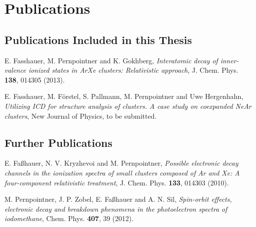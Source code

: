 \chapter*{Publications}

\section*{Publications Included in this Thesis}

  E. Fasshauer, M. Pernpointner and K. Gokhberg,
   \emph{Interatomic decay of inner-valence ionized states in ArXe clusters:
         Relativistic approach},
   J. Chem. Phys. \textbf{138}, 014305 (2013).

\vspace{2ex}

  E. Fasshauer, M. Förstel, S. Pallmann, M. Pernpointner
   and Uwe Hergenhahn,
   \emph{Utilizing ICD for structure analysis of clusters. A case study on
        coexpanded NeAr clusters},
   New Journal of Physics, to be submitted.



\section*{Further Publications}

  E. Faßhauer, N. V. Kryzhevoi and M. Pernpointner,
   \emph{Possible electronic decay channels in the ionization
         spectra of small clusters composed of Ar and Xe: A four-component
         relativistic treatment},
   J. Chem. Phys. \textbf{133}, 014303 (2010).

\vspace{2ex}

  M. Pernpointner, J. P. Zobel, E. Faßhauer and
   A. N. Sil, \emph{Spin-orbit effects, electronic decay and breakdown
                   phenomena in the photoelectron spectra of iodomethane},
   Chem. Phys. \textbf{407}, 39 (2012).

